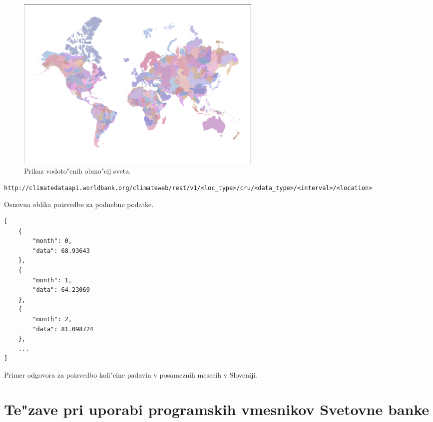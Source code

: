 \begin{figure}
\begin{center}
\includegraphics[width=12cm]{pic/climate_data_api_basins.pdf}
\end{center}
\caption{Prikaz vodoto"cnih obmo"cij sveta.}
\label{climate_data_api_basins}
\end{figure} 


\begin{snippet}
\begin{center}
\begin{lstlisting}
http://climatedataapi.worldbank.org/climateweb/rest/v1/<loc_type>/cru/<data_type>/<interval>/<location>
\end{lstlisting}
\end{center}
\caption{Osnovna oblika poizvedbe za podnebne podatke.}
\label{climate_dataset_request}
\end{snippet} 


\begin{snippet}
\begin{center}
\begin{lstlisting}
[
    {
        "month": 0,
        "data": 68.93643
    },
    {
        "month": 1,
        "data": 64.23069
    },
    {
        "month": 2,
        "data": 81.098724
    },
    ...
]
\end{lstlisting}
\end{center}
\caption{Primer odgovora za poizvedbo koli"cine padavin v posameznih mesecih v 
  Sloveniji.}
\label{climate_dataset_response}
\end{snippet} 






\section{Te"zave pri uporabi programskih vmesnikov Svetovne banke}
\label{api_gotchas}



